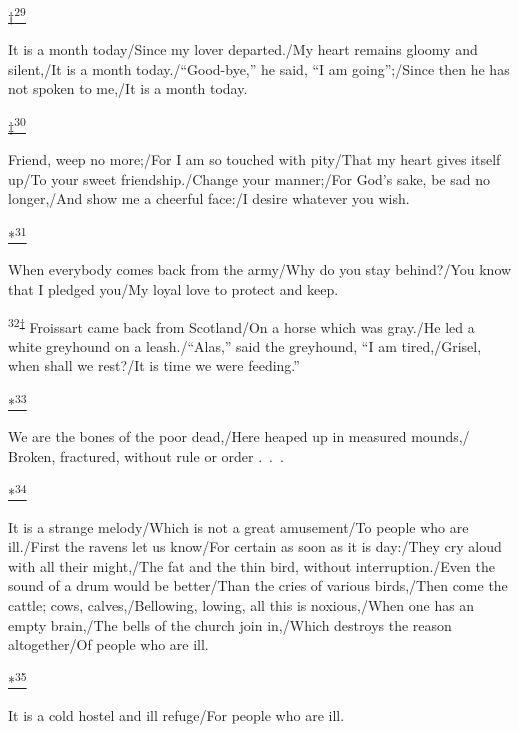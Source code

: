 \protect\hypertarget{23_NOTES.xhtmlux5cux23id_2752}{\protect\hyperlink{21_Chapter_Thirteen__IMAGE_AND_WORD.xhtmlux5cux23id_2751}{†\textsuperscript{29}}}
It is a month today/Since my lover departed./My heart remains gloomy and
silent,/It is a month today./``Good-bye,'' he said, ``I am
going'';/Since then he has not spoken to me,/It is a month today.

\protect\hypertarget{23_NOTES.xhtmlux5cux23id_2754}{\protect\hyperlink{21_Chapter_Thirteen__IMAGE_AND_WORD.xhtmlux5cux23id_2753}{‡\textsuperscript{30}}}
Friend, weep no more;/For I am so touched with pity/That my heart gives
itself up/To your sweet friendship./Change your manner;/For God's sake,
be sad no longer,/And show me a cheerful face:/I desire whatever you
wish.

\protect\hypertarget{23_NOTES.xhtmlux5cux23id_2757}{\protect\hyperlink{21_Chapter_Thirteen__IMAGE_AND_WORD.xhtmlux5cux23id_2756}{*\textsuperscript{31}}}
When everybody comes back from the army/Why do you stay behind?/You know
that I pledged you/My loyal love to protect and keep.

\textsuperscript{32\protect\hypertarget{23_NOTES.xhtmlux5cux23id_2758}{\protect\hyperlink{21_Chapter_Thirteen__IMAGE_AND_WORD.xhtmlux5cux23id_2755}{†\textsuperscript{}}}}
Froissart came back from Scotland/On a horse which was gray./He led a
white greyhound on a leash./``Alas,'' said the greyhound, ``I am
tired,/Grisel, when shall we rest?/It is time we were feeding.''

\protect\hypertarget{23_NOTES.xhtmlux5cux23id_2760}{\protect\hyperlink{21_Chapter_Thirteen__IMAGE_AND_WORD.xhtmlux5cux23id_2759}{*\textsuperscript{33}}}
We are the bones of the poor dead,/Here heaped up in measured mounds,/
Broken, fractured, without rule or order .~.~.

\protect\hypertarget{23_NOTES.xhtmlux5cux23id_2762}{\protect\hyperlink{21_Chapter_Thirteen__IMAGE_AND_WORD.xhtmlux5cux23id_2761}{*\textsuperscript{34}}}
It is a strange melody/Which is not a great amusement/To people who are
ill./First the ravens let us know/For certain as soon as it is day:/They
cry aloud with all their might,/The fat and the thin bird, without
interruption./Even the sound of a drum would be better/Than the cries of
various birds,/Then come the cattle; cows, calves,/Bellowing, lowing,
all this is noxious,/When one has an empty brain,/The bells of the
church join in,/Which destroys the reason altogether/Of people who are
ill.

\protect\hypertarget{23_NOTES.xhtmlux5cux23id_2764}{\protect\hyperlink{21_Chapter_Thirteen__IMAGE_AND_WORD.xhtmlux5cux23id_2763}{*\textsuperscript{35}}}
It is a cold hostel and ill refuge/For people who are ill.

